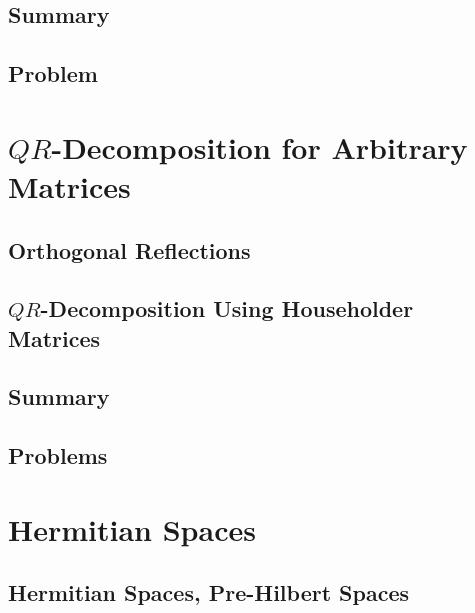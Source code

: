\documentclass[a4paper]{article}
\begin{document}
\subsection{ Summary} %

\subsection{ Problem} %


\newpage
\section{$QR$-Decomposition for Arbitrary Matrices}
\subsection{ Orthogonal Reflections} %

\subsection{ $QR$-Decomposition Using Householder Matrices} %

\subsection{ Summary} %

\subsection{ Problems} %


\newpage
\section{Hermitian Spaces}
\subsection{ Hermitian Spaces, Pre-Hilbert Spaces} %
\end{document}
